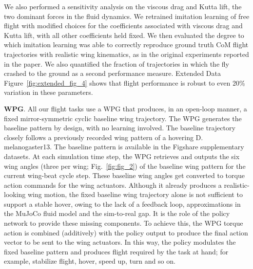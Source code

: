 \documentclass[sn-mathphys-num]{sn-jnl}%
\theoremstyle{thmstyleone}%
\theoremstyle{thmstyletwo}%
\theoremstyle{thmstylethree}%
\begin{document}
We also performed a sensitivity analysis on the viscous drag and Kutta lift, the two dominant forces in the fluid dynamics. 
We retrained imitation learning of free flight with modified choices for the coefficients associated with viscous drag and Kutta lift, with all other coefficients held fixed. 
We then evaluated the degree to which imitation learning was able to correctly reproduce ground truth CoM flight trajectories with realistic wing kinematics, as in the original experiments reported in the paper. 
We also quantified the fraction of trajectories in which the fly crashed to the ground as a second performance measure. 
Extended Data Figure~\ref{fig:extended_fig_4} shows that flight performance is robust to even 20\% variation in these parameters.


\textbf{WPG}. 
All our flight tasks use a WPG that produces, in an open-loop manner, a fixed mirror-symmetric cyclic baseline wing trajectory. 
The WPG generates the baseline pattern by design, with no learning involved. 
The baseline trajectory closely follows a previously recorded wing pattern of a hovering D. melanogaster13. 
The baseline pattern is available in the Figshare supplementary datasets\cite{vaxenburg2025whole}. 
At each simulation time step, the WPG retrieves and outputs the six wing angles (three per wing; Fig.~\ref{fig:fig_2}) of the baseline wing pattern for the current wing-beat cycle step. 
These baseline wing angles get converted to torque action commands for the wing actuators. 
Although it already produces a realistic-looking wing motion, the fixed baseline wing trajectory alone is not sufficient to support a stable hover, owing to the lack of a feedback loop, approximations in the MuJoCo fluid model and the sim-to-real gap. 
It is the role of the policy network to provide these missing components. 
To achieve this, the WPG torque action is combined (additively) with the policy output to produce the final action vector to be sent to the wing actuators. 
In this way, the policy modulates the fixed baseline pattern and produces flight required by the task at hand; 
for example, stabilize flight, hover, speed up, turn and so on.
\end{document}
